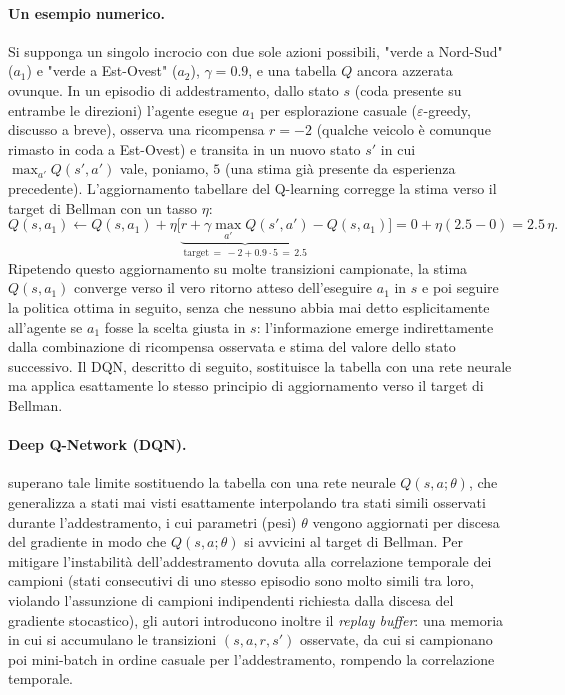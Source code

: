 \paragraph{Un esempio numerico.} Si supponga un singolo incrocio con due
sole azioni possibili, "verde a Nord-Sud" ($a_1$) e "verde a Est-Ovest"
($a_2$), $\gamma=0.9$, e una tabella $Q$ ancora azzerata ovunque. In un
episodio di addestramento, dallo stato $s$ (coda presente su entrambe le
direzioni) l'agente esegue $a_1$ per esplorazione casuale
($\varepsilon$-greedy, discusso a breve), osserva una ricompensa $r=-2$
(qualche veicolo è comunque rimasto in coda a Est-Ovest) e transita in un
nuovo stato $s'$ in cui $\max_{a'} Q(s',a')$ vale, poniamo, $5$ (una stima
già presente da esperienza precedente). L'aggiornamento tabellare del
Q-learning corregge la stima verso il target di Bellman con un tasso
$\eta$:
\[Q(s,a_1) \leftarrow Q(s,a_1) + \eta\Big[\underbrace{r + \gamma
\max_{a'}Q(s',a')}_{\text{target} \,=\, -2 + 0.9 \cdot 5 \,=\, 2.5} -
Q(s,a_1)\Big] = 0 + \eta(2.5 - 0) = 2.5\,\eta.\]
Ripetendo questo aggiornamento su molte transizioni campionate, la stima
$Q(s,a_1)$ converge verso il vero ritorno atteso dell'eseguire $a_1$ in
$s$ e poi seguire la politica ottima in seguito, senza che nessuno abbia
mai detto esplicitamente all'agente se $a_1$ fosse la scelta giusta in
$s$: l'informazione emerge indirettamente dalla combinazione di
ricompensa osservata e stima del valore dello stato successivo. Il DQN,
descritto di seguito, sostituisce la tabella con una rete neurale ma
applica esattamente lo stesso principio di aggiornamento verso il target
di Bellman.

\paragraph{Deep Q-Network (DQN).} \citet{mnih2015dqn} superano tale limite
sostituendo la tabella con una rete neurale $Q(s,a;\theta)$, che
generalizza a stati mai visti esattamente interpolando tra stati simili
osservati durante l'addestramento, i cui parametri (pesi) $\theta$ vengono
aggiornati per discesa del gradiente in modo che $Q(s,a;\theta)$ si
avvicini al target di Bellman. Per mitigare l'instabilità
dell'addestramento dovuta alla correlazione temporale dei campioni (stati
consecutivi di uno stesso episodio sono molto simili tra loro, violando
l'assunzione di campioni indipendenti richiesta dalla discesa del
gradiente stocastico), gli autori introducono inoltre il \emph{replay
buffer}: una memoria in cui si accumulano le transizioni $(s,a,r,s')$
osservate, da cui si campionano poi mini-batch in ordine casuale per
l'addestramento, rompendo la correlazione temporale.

